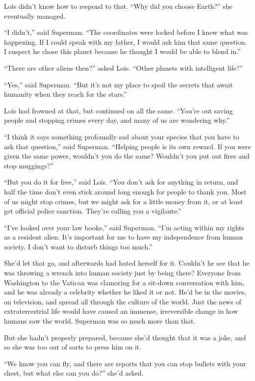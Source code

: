 Lois didn't know how to respond to that. ``Why did you choose Earth?''
she eventually managed.

``I didn't,'' said Superman. ``The coordinates were locked before I knew
what was happening. If I could speak with my father, I would ask him
that same question. I suspect he chose this planet because he thought I
would be able to blend in.''

``There are other aliens then?'' asked Lois. ``Other planets with
intelligent life?''

``Yes,'' said Superman. ``But it's not my place to spoil the secrets
that await humanity when they reach for the stars.''

Lois had frowned at that, but continued on all the same. ``You're out
saving people and stopping crimes every day, and many of us are
wondering why.''

``I think it says something profoundly sad about your species that you
have to ask that question,'' said Superman. ``Helping people is its own
reward. If you were given the same power, wouldn't you do the same?
Wouldn't you put out fires and stop muggings?''

``But you do it for free,'' said Lois. ``You don't ask for anything in
return, and half the time don't even stick around long enough for people
to thank you. Most of us might stop crimes, but we might ask for a
little money from it, or at least get official police sanction. They're
calling you a vigilante.''

``I've looked over your law books,'' said Superman. ``I'm acting within
my rights as a resident alien. It's important for me to have my
independence from human society. I don't want to disturb things too
much.''

She'd let that go, and afterwards had hated herself for it. Couldn't he
see that he was throwing a wrench into human society just by being
there? Everyone from Washington to the Vatican was clamoring for a
sit‐down conversation with him, and he was already a celebrity whether
he liked it or not. He'd be in the movies, on television, and spread all
through the culture of the world. Just the news of extraterrestrial life
would have caused an immense, irreversible change in how humans saw the
world. Superman was so much more than that.

But she hadn't properly prepared, because she'd thought that it was a
joke, and so she was too out of sorts to press him on it.

``We know you can fly, and there are reports that you can stop bullets
with your chest, but what else can you do?'' she'd asked.

